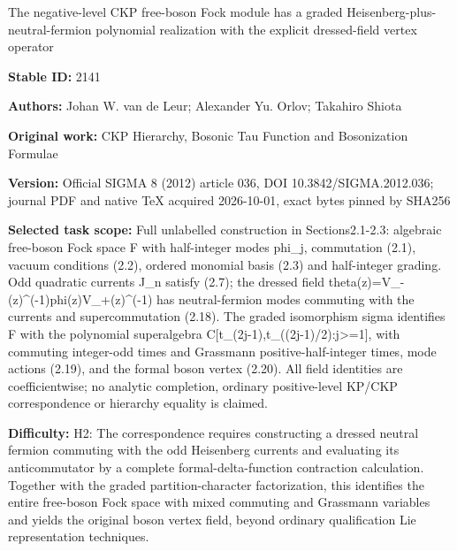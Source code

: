\documentclass[11pt]{article}
\numberwithin{equation}{section}
\begin{document}
\begin{center}\Large The negative-level CKP free-boson Fock module has a graded Heisenberg-plus-neutral-fermion polynomial realization with the explicit dressed-field vertex operator\end{center}
\noindent\textbf{Stable ID:} 2141\par
\noindent\textbf{Authors:} Johan W. van de Leur; Alexander Yu. Orlov; Takahiro Shiota\par
\noindent\textbf{Original work:} CKP Hierarchy, Bosonic Tau Function and Bosonization Formulae\par
\noindent\textbf{Version:} Official SIGMA 8 (2012) article 036, DOI 10.3842/SIGMA.2012.036; journal PDF and native TeX acquired 2026-10-01, exact bytes pinned by SHA256\par
\noindent\textbf{Selected task scope:} Full unlabelled construction in Sections2.1-2.3: algebraic free-boson Fock space F with half-integer modes phi\_j, commutation (2.1), vacuum conditions (2.2), ordered monomial basis (2.3) and half-integer grading. Odd quadratic currents J\_n satisfy (2.7); the dressed field theta(z)=\allowbreak{}V\_-(z)\textasciicircum{}(-1)phi(z)V\_+\allowbreak{}(z)\textasciicircum{}(-1) has neutral-fermion modes commuting with the currents and supercommutation (2.18). The graded isomorphism sigma identifies F with the polynomial superalgebra C[t\_(2j-1),t\_((2j-1)/2):j>=\allowbreak{}1], with commuting integer-odd times and Grassmann positive-half-integer times, mode actions (2.19), and the formal boson vertex (2.20). All field identities are coefficientwise; no analytic completion, ordinary positive-level KP/CKP correspondence or hierarchy equality is claimed.\par
\noindent\textbf{Difficulty:} H2: The correspondence requires constructing a dressed neutral fermion commuting with the odd Heisenberg currents and evaluating its anticommutator by a complete formal-delta-function contraction calculation. Together with the graded partition-character factorization, this identifies the entire free-boson Fock space with mixed commuting and Grassmann variables and yields the original boson vertex field, beyond ordinary qualification Lie representation techniques.\par
\end{document}
